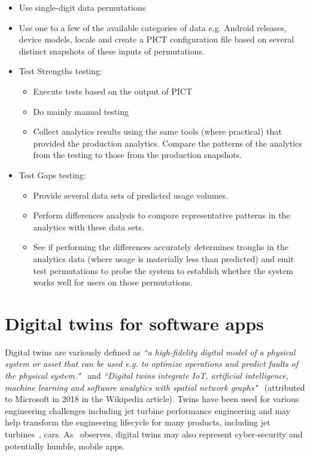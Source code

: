 \begin{itemize}
    \item Use single-digit data permutations
    \item Use one to a few of the available categories of data e.g. Android releases, device models, locale and create a PICT configuration file based on several distinct snapshots of these inputs of permutations.
    \item Test Strengths testing:
    \begin{itemize}
        \item Execute tests based on the output of PICT
        \item Do mainly manual testing
        \item Collect analytics results using the same tools (where practical) that provided the production analytics. Compare the patterns of the analytics from the testing to those from the production snapshots.
    \end{itemize}
    \item Test Gaps testing:
    \begin{itemize}
        \item Provide several data sets of predicted usage volumes.
        \item Perform differences analysis to compare representative patterns in the analytics with these data sets.
        \item See if performing the differences accurately determines troughs in the analytics data (where usage is materially less than predicted) and emit test permutations to probe the system to establish whether the system works well for users on those permutations.
    \end{itemize}

\end{itemize}
 


\section{Digital twins for software apps}
Digital twins are variously defined as \emph{``a high-fidelity digital model of a physical system or asset that can be used e.g. to optimize operations and predict faults of the physical system."}~\citep{pokhrel2020_digitaltwin_for_cybersecurity} and \emph{``Digital twins integrate IoT, artificial intelligence, machine learning and software analytics with spatial network graphs"}~\citep{wikipedia__digital_twin} (attributed to Microsoft in 2018 in the Wikipedia article). Twins have been used for various engineering challenges including jet turbine performance engineering and may help transform the engineering lifecycle for many products, including jet turbines~\citep{read2018_digital_takeover_avionics}, cars. As~\citep{pokhrel2020_digitaltwin_for_cybersecurity} observes, digital twins may also represent cyber-security and potentially humble, mobile apps.

